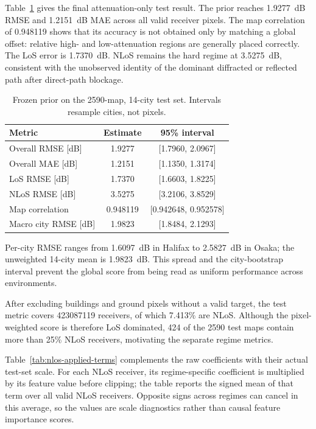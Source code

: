 \documentclass[10pt,conference]{IEEEtran}
\begin{document}
Table~\ref{tab:main} gives the final attenuation-only test result. The prior
reaches \SI{1.9277}{dB} RMSE and \SI{1.2151}{dB} MAE across all valid receiver
pixels. The map correlation of 0.948119 shows that its accuracy is not obtained
only by matching a global offset: relative high- and low-attenuation regions
are generally placed correctly. The LoS error is \SI{1.7370}{dB}. NLoS remains
the hard regime at \SI{3.5275}{dB}, consistent with the unobserved identity of
the dominant diffracted or reflected path after direct-path blockage.

\begin{table}[t]
\centering
\caption{Frozen prior on the 2590-map, 14-city test set. Intervals resample
cities, not pixels.}
\label{tab:main}
\scriptsize
\setlength{\tabcolsep}{5pt}
\begin{tabular}{lcc}
\toprule
Metric & Estimate & 95\% interval \\
\midrule
Overall RMSE [dB] & 1.9277 & [1.7960, 2.0967] \\
Overall MAE [dB] & 1.2151 & [1.1350, 1.3174] \\
LoS RMSE [dB] & 1.7370 & [1.6603, 1.8225] \\
NLoS RMSE [dB] & 3.5275 & [3.2106, 3.8529] \\
Map correlation & 0.948119 & [0.942648, 0.952578] \\
Macro city RMSE [dB] & 1.9823 & [1.8484, 2.1293] \\
\bottomrule
\end{tabular}
\end{table}

Per-city RMSE ranges from \SI{1.6097}{dB} in Halifax to \SI{2.5827}{dB} in
Osaka; the unweighted 14-city mean is \SI{1.9823}{dB}. This spread and the
city-bootstrap interval prevent the global score from being read as uniform
performance across environments.

After excluding buildings and ground pixels without a valid target, the test
metric covers \num{423087119} receivers, of which 7.413\% are NLoS. Although
the pixel-weighted score is therefore LoS dominated, 424 of the 2590 test maps
contain more than 25\% NLoS receivers, motivating the separate regime metrics.

Table~\ref{tab:nlos-applied-terms} complements the raw coefficients with their
actual test-set scale. For each NLoS receiver, its regime-specific coefficient
is multiplied by its feature value before clipping; the table reports the
signed mean of that term over all valid NLoS receivers. Opposite
signs across regimes can cancel in this average, so the values are scale
diagnostics rather than causal feature importance scores.
\end{document}

